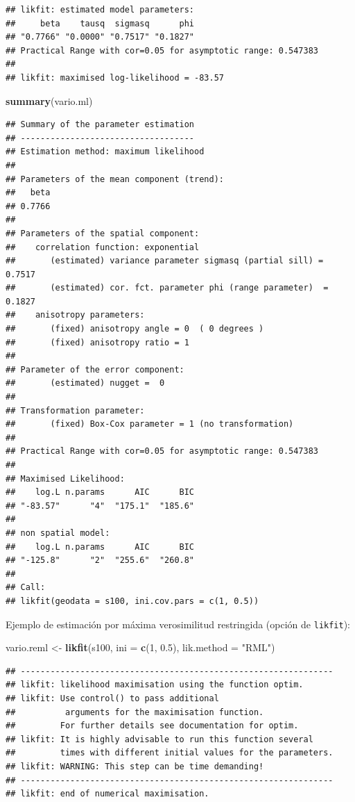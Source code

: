 \documentclass[
]{book}
\newenvironment{Shaded}{\begin{snugshade}}{\end{snugshade}}
\newcommand{\AttributeTok}[1]{\textcolor[rgb]{0.13,0.29,0.53}{#1}}
\newcommand{\DecValTok}[1]{\textcolor[rgb]{0.00,0.00,0.81}{#1}}
\newcommand{\FloatTok}[1]{\textcolor[rgb]{0.00,0.00,0.81}{#1}}
\newcommand{\FunctionTok}[1]{\textcolor[rgb]{0.13,0.29,0.53}{\textbf{#1}}}
\newcommand{\NormalTok}[1]{#1}
\newcommand{\OtherTok}[1]{\textcolor[rgb]{0.56,0.35,0.01}{#1}}
\newcommand{\StringTok}[1]{\textcolor[rgb]{0.31,0.60,0.02}{#1}}
\theoremstyle{break}
\theoremstyle{definition}
\theoremstyle{definition}
\theoremstyle{definition}
\theoremstyle{definition}
\theoremstyle{remark}
\begin{document}
\begin{verbatim}
## likfit: estimated model parameters:
##     beta    tausq  sigmasq      phi 
## "0.7766" "0.0000" "0.7517" "0.1827" 
## Practical Range with cor=0.05 for asymptotic range: 0.547383
## 
## likfit: maximised log-likelihood = -83.57
\end{verbatim}

\begin{Shaded}
\begin{Highlighting}[]
\FunctionTok{summary}\NormalTok{(vario.ml)}
\end{Highlighting}
\end{Shaded}

\begin{verbatim}
## Summary of the parameter estimation
## -----------------------------------
## Estimation method: maximum likelihood 
## 
## Parameters of the mean component (trend):
##   beta 
## 0.7766 
## 
## Parameters of the spatial component:
##    correlation function: exponential
##       (estimated) variance parameter sigmasq (partial sill) =  0.7517
##       (estimated) cor. fct. parameter phi (range parameter)  =  0.1827
##    anisotropy parameters:
##       (fixed) anisotropy angle = 0  ( 0 degrees )
##       (fixed) anisotropy ratio = 1
## 
## Parameter of the error component:
##       (estimated) nugget =  0
## 
## Transformation parameter:
##       (fixed) Box-Cox parameter = 1 (no transformation)
## 
## Practical Range with cor=0.05 for asymptotic range: 0.547383
## 
## Maximised Likelihood:
##    log.L n.params      AIC      BIC 
## "-83.57"      "4"  "175.1"  "185.6" 
## 
## non spatial model:
##    log.L n.params      AIC      BIC 
## "-125.8"      "2"  "255.6"  "260.8" 
## 
## Call:
## likfit(geodata = s100, ini.cov.pars = c(1, 0.5))
\end{verbatim}

Ejemplo de estimación por máxima verosimilitud restringida (opción de
\texttt{likfit}):

\begin{Shaded}
\begin{Highlighting}[]
\NormalTok{vario.reml }\OtherTok{\textless{}{-}} \FunctionTok{likfit}\NormalTok{(s100, }\AttributeTok{ini =} \FunctionTok{c}\NormalTok{(}\DecValTok{1}\NormalTok{, }\FloatTok{0.5}\NormalTok{), }\AttributeTok{lik.method =} \StringTok{"RML"}\NormalTok{)}
\end{Highlighting}
\end{Shaded}

\begin{verbatim}
## ---------------------------------------------------------------
## likfit: likelihood maximisation using the function optim.
## likfit: Use control() to pass additional
##          arguments for the maximisation function.
##         For further details see documentation for optim.
## likfit: It is highly advisable to run this function several
##         times with different initial values for the parameters.
## likfit: WARNING: This step can be time demanding!
## ---------------------------------------------------------------
## likfit: end of numerical maximisation.
\end{verbatim}
\end{document}
